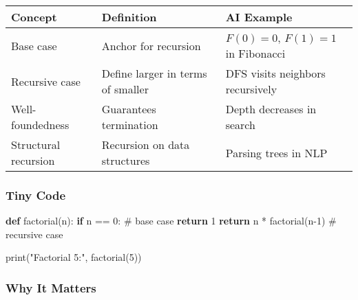 \documentclass[
  letterpaper,
  DIV=11,
  numbers=noendperiod]{scrreprt}
\newenvironment{Shaded}{\begin{snugshade}}{\end{snugshade}}
\newcommand{\BuiltInTok}[1]{\textcolor[rgb]{0.00,0.23,0.31}{#1}}
\newcommand{\CommentTok}[1]{\textcolor[rgb]{0.37,0.37,0.37}{#1}}
\newcommand{\ControlFlowTok}[1]{\textcolor[rgb]{0.00,0.23,0.31}{\textbf{#1}}}
\newcommand{\DecValTok}[1]{\textcolor[rgb]{0.68,0.00,0.00}{#1}}
\newcommand{\KeywordTok}[1]{\textcolor[rgb]{0.00,0.23,0.31}{\textbf{#1}}}
\newcommand{\NormalTok}[1]{\textcolor[rgb]{0.00,0.23,0.31}{#1}}
\newcommand{\OperatorTok}[1]{\textcolor[rgb]{0.37,0.37,0.37}{#1}}
\newcommand{\StringTok}[1]{\textcolor[rgb]{0.13,0.47,0.30}{#1}}
\begin{document}
\begin{longtable}[]{@{}
  >{\raggedright\arraybackslash}p{}
  >{\raggedright\arraybackslash}p{}
  >{\raggedright\arraybackslash}p{}@{}}
\toprule\noalign{}
\begin{minipage}[b]{\linewidth}\raggedright
Concept
\end{minipage} & \begin{minipage}[b]{\linewidth}\raggedright
Definition
\end{minipage} & \begin{minipage}[b]{\linewidth}\raggedright
AI Example
\end{minipage} \\
\midrule\noalign{}
\endhead
\bottomrule\noalign{}
\endlastfoot
Base case & Anchor for recursion & \(F(0)=0\), \(F(1)=1\) in
Fibonacci \\
Recursive case & Define larger in terms of smaller & DFS visits
neighbors recursively \\
Well-foundedness & Guarantees termination & Depth decreases in search \\
Structural recursion & Recursion on data structures & Parsing trees in
NLP \\
\end{longtable}

\subsubsection{Tiny Code}\label{tiny-code-172}

\begin{Shaded}
\begin{Highlighting}[]
\KeywordTok{def}\NormalTok{ factorial(n):}
    \ControlFlowTok{if}\NormalTok{ n }\OperatorTok{==} \DecValTok{0}\NormalTok{:   }\CommentTok{\# base case}
        \ControlFlowTok{return} \DecValTok{1}
    \ControlFlowTok{return}\NormalTok{ n }\OperatorTok{*}\NormalTok{ factorial(n}\OperatorTok{{-}}\DecValTok{1}\NormalTok{)  }\CommentTok{\# recursive case}

\BuiltInTok{print}\NormalTok{(}\StringTok{"Factorial 5:"}\NormalTok{, factorial(}\DecValTok{5}\NormalTok{))}
\end{Highlighting}
\end{Shaded}

\subsubsection{Why It Matters}\label{why-it-matters-85}
\end{document}
